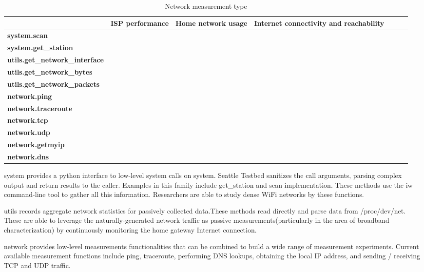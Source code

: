 \documentclass[11pt, oneside]{article}   	%
\begin{document}
\begin{table*} %
\scriptsize
\centering
\begin{tabular}{|l|c|c|c|c|c|c|}
\hline
\textbf{}    &  \textbf{ISP performance} & \textbf{Home network usage}  & \textbf{Internet connectivity and reachability}\\
 \hline
 {\bf system.scan} & {\bf *} & {\bf } & {\bf }\\
\hline
 {\bf system.get\_station} & {\bf *} & {\bf *} & {\bf }\\
\hline
 {\bf utils.get\_network\_interface} & {\bf *} & {\bf } & {\bf }\\
\hline
 {\bf utils.get\_network\_bytes} & {\bf *} & {\bf } & {\bf }\\
\hline
 {\bf utils.get\_network\_packets} & {\bf *} & {\bf } & {\bf *}\\
\hline
 {\bf network.ping} & {\bf *} & {\bf } & {\bf *}\\
\hline
 {\bf network.traceroute} & {\bf } & {\bf } & {\bf *}\\
\hline
 {\bf network.tcp} & {\bf *} & {\bf } & {\bf *}\\
\hline
 {\bf network.udp} & {\bf *} & {\bf *} & {\bf }\\
\hline
 {\bf network.getmyip} & {\bf *} & {\bf *} & {\bf *} \\
\hline
 {\bf network.dns} & {\bf *} & {\bf } & {\bf *}\\
\hline
\end{tabular}
\caption {Network measurement type}
\label{table:type}
\end{table*}

system provides a python interface to low-level system calls on system. Seattle Testbed sanitizes the call arguments, parsing complex output and return results to the caller. Examples in this family include get\_station and scan implementation. These methods use the iw command-line tool to gather all this information. Researchers are able to study dense WiFi networks by these functions.

utils records aggregate network statistics for passively collected data.These methods read directly and parse data from /proc/dev/net. These are able to leverage the naturally-generated network traffic as passive measurements(particularly in the area of broadband characterization) by continuously monitoring the home gateway Internet connection.

network provides low-level measurements functionalities that can be combined to build a wide range of measurement experiments. Current available measurement functions include ping, traceroute, performing DNS lookups, obtaining the local IP address, and sending / receiving TCP and UDP traffic.
\end{document}
